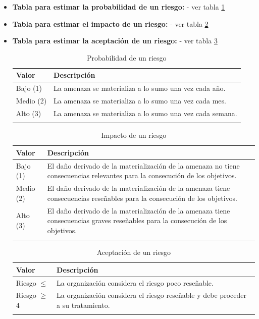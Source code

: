 \begin{enumerate}
\begin{itemize}

\item{\textbf{Tabla para estimar la probabilidad de un riesgo:}} - ver tabla \ref{prob_riesgo}
\item{\textbf{Tabla para estimar el impacto de un riesgo:}} - ver tabla \ref{impacto_riesgo}
\item{\textbf{Tabla para estimar la aceptación de un riesgo:}} - ver tabla \ref{aceptacion_riesgo}


\bigskip

\begingroup
\renewcommand\arraystretch{1.3}
\begin{longtable}{l p{13cm}}
\hline
\textbf{Valor} & \textbf{Descripción} \\
\hline
\endhead
\endfoot
Bajo (1) & 
La amenaza se materializa a lo sumo una vez cada año. 
 \\
Medio (2) & 
La amenaza se materializa a lo sumo una vez cada mes.
 \\
Alto (3) & 
La amenaza se materializa a lo sumo una vez cada semana.
 \\
\hline
\caption{Probabilidad de un riesgo}\label{prob_riesgo}\\
\end{longtable}

\begin{longtable}{l p{13cm}}
\hline
\textbf{Valor} & \textbf{Descripción} \\
\hline
\endhead
\endfoot
Bajo (1) & 
El daño derivado de la materialización de la amenaza no tiene consecuencias relevantes para la consecución de los objetivos.  
 \\
Medio (2) & 
El daño derivado de la materialización de la amenaza tiene consecuencias reseñables para la consecución de los objetivos.
 \\
Alto (3) & 
El daño derivado de la materialización de la amenaza tiene consecuencias graves reseñables para la consecución de los objetivos.
 \\
\hline
\caption{Impacto de un riesgo}\label{impacto_riesgo}\\
\end{longtable}



\begin{longtable}{l p{13cm}}
\hline
\textbf{Valor} & \textbf{Descripción} \\
\hline
\endhead
\endfoot
Riesgo $\leq$ & 
La organización considera el riesgo poco reseñable. 
 \\
Riesgo $\geq$ 4 & 
La organización considera el riesgo reseñable y debe proceder a su tratamiento.
 \\
\hline
\caption{Aceptación de un riesgo}\label{aceptacion_riesgo}\\
\end{longtable}


\end{itemize}
\end{enumerate}
